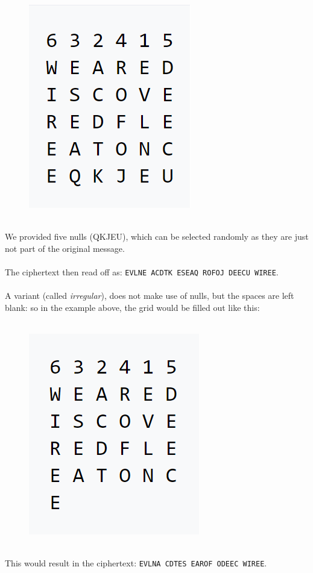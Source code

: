 \documentclass[Lau,binding=0.6cm,oneside]{sapthesis}
\begin{document}
\begin{appendices}
\begin{figure}[H]
\includegraphics[scale=0.42]{columnar_regular}
\centering
\caption{}
\centering
\end{figure}
\ \\
We provided five nulls (\textsf{QKJEU}), which can be selected randomly as they are just not part of the original message.\\\\
The ciphertext then read off as: \colorbox{gray!12}{\small{\texttt{EVLNE ACDTK ESEAQ ROFOJ DEECU WIREE}}}.\\\\
A variant (called \textit{irregular}), does not make use of nulls, but the spaces are left blank: so in the example above, the grid would be filled out like this:\\\\

\begin{figure}[H]
\includegraphics[scale=0.42]{columnar_irregular}
\centering
\caption{}
\centering
\end{figure}
\ \\
This would result in the ciphertext: \colorbox{gray!12}{\small{\texttt{EVLNA CDTES EAROF ODEEC WIREE}}}.\\\\


\end{appendices}
\end{document}
